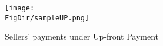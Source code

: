 \hypertarget{sampleUP}{}
\begin{figure}
	\centerline{\texttt{[image: \\FigDir/sampleUP.png]}}
	\caption{Sellers' payments under Up-front Payment}
	\label{fig:sampleUP}
\end{figure}
